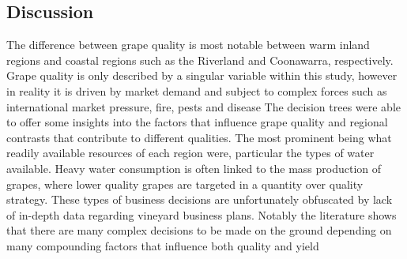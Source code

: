 \documentclass[review,12pt,authoryear]{elsarticle}
\begin{document}
\begin{linenumbers}
\section{Discussion}
The difference between grape quality is most notable between warm inland regions and coastal regions such as the Riverland and Coonawarra, respectively. Grape quality is only described by a singular variable within this study, however in reality it is driven by market demand and subject to  complex forces such as international market pressure, fire, pests and disease \autocite{wineaustraliaNationalVintageReport2019,wineaustraliaNationalVintageReport2020,wineaustraliaNationalVintageReport2021,wineaustraliaNationalVintageReport2022,winemakersfederationofaustraliaNationalVintageReport2015,winemakersfederationofaustraliaNationalVintageReport2016,winemakersfederationofaustraliaNationalVintageReport2017,winemakersfederationofaustraliaNationalVintageReport2018} %
The decision trees were able to offer some insights into the factors that influence grape quality and regional contrasts that contribute to different qualities. The most prominent being what readily available resources of each region were, particular the types of water available. %
 Heavy water consumption is often linked to the mass production of grapes, %
 where lower quality grapes are targeted in a quantity over quality strategy. These types of business decisions are unfortunately obfuscated by lack of in-depth data regarding vineyard business plans. 
 Notably the literature shows that there are many complex decisions to be made on the ground depending on many compounding factors that influence both quality and yield \autocite{abadCoverCropsViticulture2021,cortezUsingDataMining2009,hallWithinseasonTemporalVariation2011,i.goodwinManagingSoilWater2009,kasimatiPredictingGrapeSugar2022,oliverReviewSoilPhysical2013,srivastavaNondestructiveSensingMethods2018}

\end{linenumbers}
\end{document}
